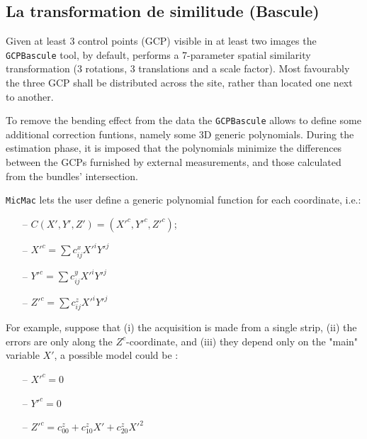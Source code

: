 \documentclass[11pt,a4paper,oneside]{book}
\begin{document}
\subsection{La transformation de similitude (Bascule)}\label{subsec:basc}
%
Given at least 3 control points (GCP) visible in at least two images the {\tt GCPBascule} tool, by default, performs a 7-parameter spatial similarity transformation (3 rotations, 3 translations and a scale factor). Most favourably the three GCP shall be distributed across the site, rather than located one next to another.\par 
%
To remove the bending effect from the data the {\tt GCPBascule} allows to define some additional correction funtions, namely some 3D generic polynomials. During the estimation phase, it is imposed that the polynomials minimize the differences between the GCPs furnished by external measurements, and those calculated from the bundles' intersection. \par 
%
{\tt MicMac} lets the user define a generic polynomial function for each coordinate, i.e.:
%
\begin{itemize}
   \item[--] $C(X',Y',Z') = (X'^c,Y'^c,Z'^c)$;
   \item[--] $X'^c = \sum c^x_{ij} X'^i Y'^j$
   \item[--] $Y'^c = \sum c^y_{ij} X'^i Y'^j$
   \item[--] $Z'^c = \sum c^z_{ij} X'^i Y'^j$
\end{itemize}
%
For example, suppose that (i) the acquisition is made from a single strip, (ii) the errors are only along the $Z^c$-coordinate,  and (iii) they depend only on  the "main" variable $X'$, a possible model could be :
%
\begin{itemize}
   \item[--] $X'^c = 0$
   \item[--] $Y'^c = 0$
   \item[--] $Z'^c =  c^z_{00} + c^z_{10} X' + c^z_{20} X'^2$
\end{itemize}
%
\end{document}
